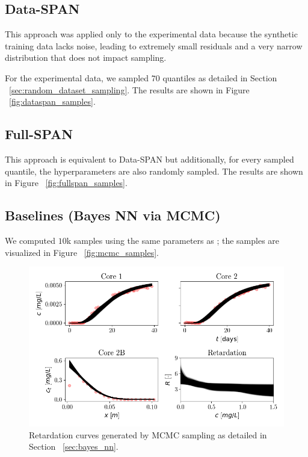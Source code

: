 \subsection{Data-SPAN}
This approach was applied only to the experimental data because the synthetic training data lacks noise, leading to extremely small residuals and a very narrow distribution that does not impact sampling.

For the experimental data, we sampled $70$ quantiles as detailed in Section ~\vref{sec:random_dataset_sampling}. The results are shown in Figure ~\vref{fig:dataspan_samples}.



\subsection{Full-SPAN}
This approach is equivalent to Data-SPAN but additionally, for every sampled quantile, the hyperparameters are also randomly sampled. The results are shown in Figure ~\vref{fig:fullspan_samples}.


\subsection{Baselines (Bayes NN via MCMC)}
We computed $10$k samples using the same parameters as \cite{finn}; the samples are visualized in Figure ~\vref{fig:mcmc_samples}.

\begin{figure}[h]
    \centering
    \includegraphics{figs/finn_mcmc_samples.png}
    \caption{Retardation curves generated by MCMC sampling as detailed in Section ~\vref{sec:bayes_nn}.}
    \label{fig:mcmc_samples}
\end{figure}





